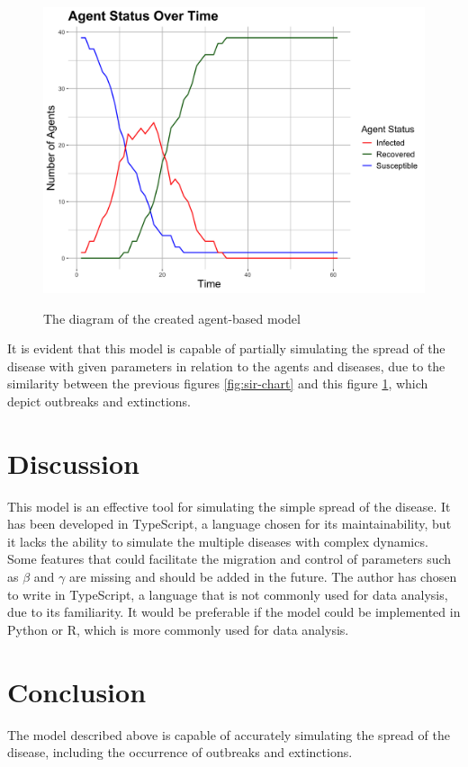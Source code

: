 \documentclass[12pt]{article}
\begin{document}
\begin{figure}[ht]
	\centering
	\includegraphics[width=0.9\linewidth]{./assets/report-20246030-132911/diagram.png}
    \label{fig:agent-based-model-chart} 
	\caption{\scriptsize \sffamily The diagram of the created agent-based model}
\end{figure}

It is evident that this model is capable of partially simulating the spread of the disease with given parameters in relation to the agents and diseases, due to the similarity between the previous figures \ref{fig:sir-chart} and this figure \ref{fig:agent-based-model-chart}, which depict outbreaks and extinctions.

\section{Discussion}
This model is an effective tool for simulating the simple spread of the disease. It has been developed in TypeScript, a language chosen for its maintainability, but it lacks the ability to simulate the multiple diseases with complex dynamics. Some features that could facilitate the migration and control of parameters such as $\beta$ and $\gamma$ are missing and should be added in the future. The author has chosen to write in TypeScript, a language that is not commonly used for data analysis, due to its familiarity. It would be preferable if the model could be implemented in Python or R, which is more commonly used for data analysis.

\section{Conclusion}
The model described above is capable of accurately simulating the spread of the disease, including the occurrence of outbreaks and extinctions.
\end{document}
